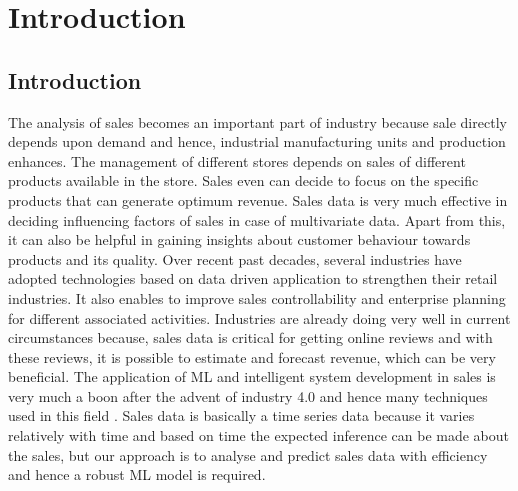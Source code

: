 
\chapter{Introduction} %

\label{c1} %


\section{Introduction}
The analysis of sales becomes an important part of industry because sale directly depends upon demand and hence, industrial manufacturing units and production enhances. The management of different stores depends on sales of different products available in the store. Sales even can decide to focus on the specific products that can generate optimum revenue. Sales data is very much effective in deciding influencing factors of sales in case of multivariate data. Apart from this, it can also be helpful in gaining insights about customer behaviour towards products and its quality. Over recent past decades, several industries have adopted technologies based on data driven application to strengthen their retail industries. It also enables to improve sales controllability \cite{wang2023forecasting} and enterprise planning for different associated activities\cite{panjwani2020sales}. Industries are already doing very well in current circumstances because, sales data is critical for getting online reviews and with these reviews, it is possible to estimate and forecast revenue, which can be very beneficial. The application of ML and intelligent system development in sales is very much a boon after the advent of industry 4.0 and hence many techniques used in this field \cite{syam2018waiting}. Sales data is basically a time series data because it varies relatively with time and based on time the expected inference can be made about the sales, but our approach is to analyse and predict sales data with efficiency and hence a robust ML model is required. 


